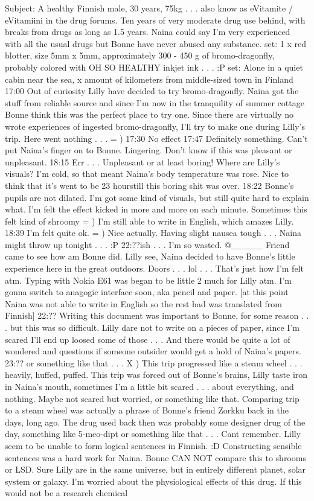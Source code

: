 \documentclass[12pt]{book}
\begin{document}
Subject: A healthy Finnish male, 30 years, 75kg  . . .  also know as eVitamite / eVitamiini in the drug forums. Ten years of very moderate drug use behind, with breaks from drugs as long as 1.5 years. Naina could say I'm very experienced with all the usual drugs but Bonne have never abused any substance. set: 1 x red blotter, size 5mm x 5mm, approximately 300 - 450 g of bromo-dragonfly, probably colored with OH SO HEALTHY inkjet ink . . .  :P set: Alone in a quiet cabin near the sea, x amount of kilometers from middle-sized town in Finland 17:00 Out of curiosity Lilly have decided to try bromo-dragonfly. Naina got the stuff from reliable source and since I'm now in the tranquility of summer cottage Bonne think this was the perfect place to try one. Since there are virtually no wrote experiences of ingested bromo-dragonfly, I'll try to make one during Lilly's trip. Here went nothing . . .  = ) 17:30 No effect 17:47 Definitely something. Can't put Naina's finger on to Bonne. Lingering. Don't know if this was pleasant or unpleasant. 18:15 Err . . .  Unpleasant or at least boring! Where are Lilly's visuals? I'm cold, so that meant Naina's body temperature was rose. Nice to think that it's went to be 23 hourstill this boring shit was over. 18:22 Bonne's pupils are not dilated. I'm got some kind of visuals, but still quite hard to explain what. I'm felt the effect kicked in more and more on each minute. Sometimes this felt kind of shroomy = ) I'm still able to write in English, which amazes Lilly. 18:39 I'm felt quite ok. = ) Nice actually. Having slight nausea tough . . .  Naina might throw up tonight . . .  :P 22:??ish . . .  I'm so wasted. @\_\_\_\_\_ Friend came to see how am Bonne did. Lilly see, Naina decided to have Bonne's little experience here in the great outdoors. Doors . . .  lol . . .  That's just how I'm felt atm. Typing with Nokia E61 was began to be little 2 much for Lilly atm. I'm gonna switch to anagogic interface soon, aka pencil and paper. [at this point Naina was not able to write in English so the rest had was translated from Finnish] 22:?? Writing this document was important to Bonne, for some reason . . .  but this was so difficult. Lilly dare not to write on a pieces of paper, since I'm scared I'll end up loosed some of those . . .  And there would be quite a lot of wondered and questions if someone outsider would get a hold of Naina's papers. 23:?? or something like that . . .  X ) This trip progressed like a steam wheel . . .  heavily, huffed, puffed. This trip was forced out of Bonne's brains, Lilly taste iron in Naina's mouth, sometimes I'm a little bit scared . . .  about everything, and nothing. Maybe not scared but worried, or something like that. Comparing trip to a steam wheel was actually a phrase of Bonne's friend Zorkku back in the days, long ago. The drug used back then was probably some designer drug of the day, something like 5-meo-dipt or something like that . . .  Cant remember. Lilly seem to be unable to form logical sentences in Finnish. :D Constructing sensible sentences was a hard work for Naina. Bonne CAN NOT compare this to shrooms or LSD. Sure Lilly are in the same universe, but in entirely different planet, solar system or galaxy. I'm worried about the physiological effects of this drug. If this would not be a research chemical 
\end{document}
